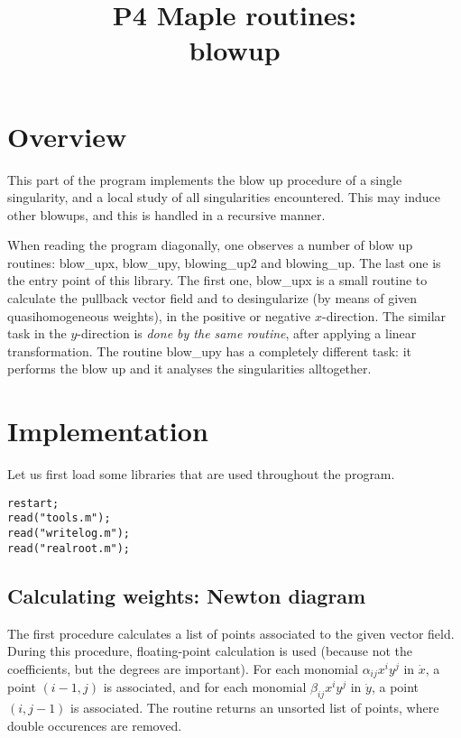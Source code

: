 \documentclass[a4paper,10pt]{article}
\title{P4 Maple routines:\\blowup}
\author{}
\date{}
\begin{document}
\maketitle

\section{Overview}

This part of the program implements the blow up procedure of a single singularity, and a local
study of all singularities encountered.  This may induce other blowups, and this is handled
in a recursive manner.

When reading the program diagonally, one observes a number of blow up routines: blow\_upx, blow\_upy,
blowing\_up2 and blowing\_up.  The last one is the entry point of this library.  The first one, blow\_upx
is a small routine to calculate the pullback vector field and to desingularize (by means of given
quasihomogeneous weights), in the positive or negative $x$-direction.  The similar task in the $y$-direction
is \emph{done by the same routine}, after applying a linear transformation.  The routine blow\_upy has
a completely different task: it performs the blow up and it analyses the singularities alltogether.

\section{Implementation}

Let us first load some libraries that are used throughout the program.

\begin{lstlisting}[name=blowup]
restart;
read("tools.m");
read("writelog.m");
read("realroot.m");
\end{lstlisting}

\subsection{Calculating weights: Newton diagram}

The first procedure calculates a list of points associated to the given vector field. During this procedure,
floating-point calculation is used (because not the coefficients, but the degrees are important).  For each
monomial $\alpha_{ij}x^iy^j$ in $\dot{x}$, a point $(i-1,j)$ is associated, and for each monomial
$\beta_{ij}x^iy^j$ in $\dot{y}$, a point $(i,j-1)$ is associated. The routine returns an unsorted list of points,
where double occurences are removed.
\end{document}
